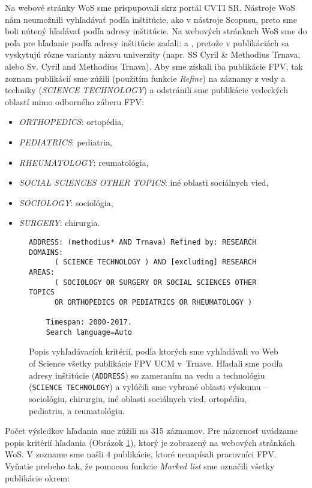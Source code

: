 Na webové stránky WoS sme prispupovali skrz portál CVTI SR. Nástroje WoS nám
neumožnili vyhľadávať podľa inštitúcie, ako v nástroje Scopusu, preto sme boli
nútený hľadávať podľa adresy inštitúcie. Na webových stránkach WoS sme do poľa
pre hľadanie podľa adresy inštitúcie zadali:  a ,
pretože v publikáciách sa vyskytujú rôzne varianty názvu univerzity (napr. SS
Cyril \& Methodius Trnava, alebo Sv. Cyril and Methodius Trnava).  Aby sme
získali iba publikácie FPV, tak zoznam publikácií sme zúžili (použitím funkcie
\emph{Refine}) na záznamy z vedy a techniky (\emph{SCIENCE TECHNOLOGY}) a
odstránili sme publikácie vedeckých oblastí mimo odborného záberu FPV:

\begin{itemize}
  \item \emph{ORTHOPEDICS}: ortopédia,
  \item \emph{PEDIATRICS}: pediatria, 
  \item \emph{RHEUMATOLOGY}: reumatológia,
  \item \emph{SOCIAL SCIENCES OTHER TOPICS}: iné oblasti sociálnych vied,
  \item \emph{SOCIOLOGY}: sociológia,
  \item \emph{SURGERY}: chirurgia.
\end{itemize}

\begin{figure}
  \footnotesize
  \begin{Verbatim}[frame=single]
    ADDRESS: (methodius* AND Trnava) Refined by: RESEARCH DOMAINS: 
      ( SCIENCE TECHNOLOGY ) AND [excluding] RESEARCH AREAS: 
      ( SOCIOLOGY OR SURGERY OR SOCIAL SCIENCES OTHER TOPICS 
      OR ORTHOPEDICS OR PEDIATRICS OR RHEUMATOLOGY ) 

    Timespan: 2000-2017.
    Search language=Auto
  \end{Verbatim}
  \vspace*{-4mm}
  \caption[Popis kritérií vyhľadávania vo WoS pre FPV]{Popis vyhľadávacích
  krítérií, podľa ktorých sme vyhľadávali vo Web of Science všetky publikácie
  FPV UCM v~Trnave.  Hľadali sme podľa adresy inštitúcie (\texttt{ADDRESS}) so zameraním
  na vedu a technológiu (\texttt{SCIENCE TECHNOLOGY}) a vylúčili sme vybrané
  oblasti výskumu -- sociológiu, chirurgiu, iné oblasti sociálnych vied,
  ortopédiu, pediatriu, a reumatológiu.}
  \label{fig:wos.query}
\end{figure}


Počet výsledkov hľadania sme zúžili na 315 záznamov. Pre názornosť uvádzame
popis kritérií hľadania (Obrázok \ref{fig:wos.query}), ktorý je zobrazený na
webových stránkách WoS.  V zozname sme našli 4 publikácie, ktoré nenapísali
pracovníci FPV.  Vyňatie prebeho tak, že pomocou funkcie \emph{Marked list} sme
označili všetky publikácie okrem: 

